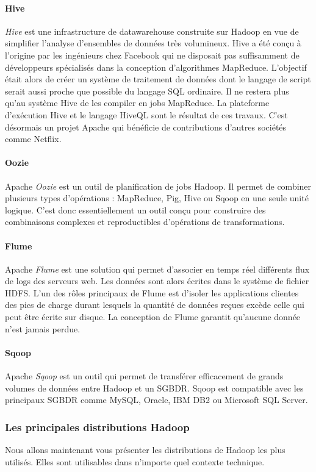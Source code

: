 \documentclass[12pt]{article}
\begin{document}
\paragraph{Hive}
\textit{Hive} est une infrastructure de datawarehouse construite sur Hadoop en vue de simplifier l'analyse d'ensembles de données très volumineux. Hive a été conçu à l'origine par les ingénieurs chez Facebook qui ne disposait pas  suffisamment de développeurs spécialisés dans la conception d'algorithmes MapReduce. L'objectif était alors de créer un système de traitement de données dont le langage de script serait aussi proche que possible du langage SQL ordinaire. Il ne restera plus qu'au système Hive de les compiler en jobs MapReduce. La plateforme d'exécution Hive et le langage HiveQL sont le résultat de ces travaux. C'est désormais un projet Apache qui bénéficie de contributions d'autres sociétés comme Netflix.
\paragraph{Oozie}
Apache \textit{Oozie} est un outil de planification de jobs Hadoop. Il permet de combiner plusieurs types d'opérations : MapReduce, Pig, Hive ou Sqoop en une seule unité logique. C'est donc essentiellement un outil conçu pour construire des combinaisons complexes et reproductibles d'opérations de transformations.
\paragraph{Flume}
Apache \textit{Flume} est une solution qui permet d'associer en temps réel différents flux de logs des serveurs web. Les données sont alors écrites dans le système de fichier HDFS. L'un des rôles principaux de Flume est d'isoler les applications clientes des pics de charge durant lesquels la quantité de données reçues excède celle qui peut être écrite sur disque. La conception de Flume garantit qu'aucune donnée n'est jamais perdue. 
\paragraph{Sqoop}
Apache \textit{Sqoop} est un outil qui permet de transférer efficacement de grands volumes de données entre Hadoop et un SGBDR. Sqoop est compatible avec les principaux SGBDR comme MySQL, Oracle, IBM DB2 ou Microsoft SQL Server. 
\subsubsection{Les principales distributions Hadoop}
Nous allons maintenant vous présenter les distributions de Hadoop les plus utilisés. Elles sont utilisables dans n'importe quel contexte technique.
\end{document}
